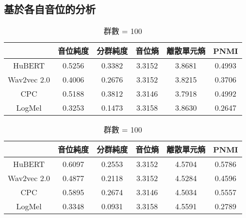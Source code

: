 
\subsection{基於各自音位的分析}

\begin{table}[!htbp]
    \centering
    \begin{subtable}[t]{\textwidth}
        \centering
        \begin{tabular}{|c|c|c|c|c|c|} \hline
                        & 音位純度   & 分群純度   & 音位熵    & 離散單元熵  & PNMI   \\ \hline
            HuBERT      & 0.5256 & 0.3382 & 3.3152 & 3.8681 & 0.4993 \\ \hline    %
            Wav2vec 2.0 & 0.4006 & 0.2676 & 3.3152 & 3.8215 & 0.3706 \\ \hline    %
            CPC         & 0.5188 & 0.3812 & 3.3146 & 3.7918 & 0.4992 \\ \hline    %
            LogMel      & 0.3253 & 0.1473 & 3.3158 & 3.8630 & 0.2647 \\ \hline    %
        \end{tabular}
        \caption{群數 = 50}
        \label{tab:ch3-clu050-phn}
    \end{subtable}

    \vspace{0.5cm}

    \begin{subtable}[t]{\textwidth}
        \centering
        \begin{tabular}{|c|c|c|c|c|c|} \hline
                        & 音位純度   & 分群純度   & 音位熵    & 離散單元熵  & PNMI   \\ \hline
            HuBERT      & 0.6097 & 0.2553 & 3.3152 & 4.5704 & 0.5786 \\ \hline    %
            Wav2vec 2.0 & 0.4877 & 0.2118 & 3.3152 & 4.5284 & 0.4596 \\ \hline    %
            CPC         & 0.5895 & 0.2674 & 3.3146 & 4.5034 & 0.5557 \\ \hline    %
            LogMel      & 0.3348 & 0.0931 & 3.3158 & 4.5591 & 0.2789 \\ \hline    %
        \end{tabular}
        \caption{群數 = 100}
        \label{tab:ch3-clu100-phn}
    \end{subtable}


\end{table}
